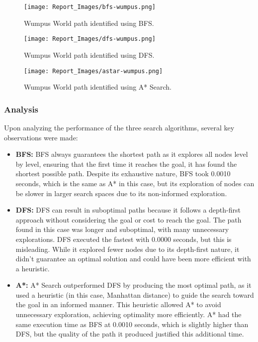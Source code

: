 \documentclass[12pt]{article}
\begin{document}
\begin{figure}[h!]
\centering
\texttt{[image: Report\_Images/bfs-wumpus.png]}
\caption{Wumpus World path identified using BFS.}
\label{fig:BFS_wumpus}
\end{figure}

\begin{figure}[h!]
\centering
\texttt{[image: Report\_Images/dfs-wumpus.png]}
\caption{Wumpus World path identified using DFS.}
\label{fig:DFS_wumpus}
\end{figure}

\begin{figure}[h!]
\centering
\texttt{[image: Report\_Images/astar-wumpus.png]}
\caption{Wumpus World path identified using A* Search.}
\label{fig:Astar_wumpus}
\end{figure}

\subsubsection{Analysis}

Upon analyzing the performance of the three search algorithms, several key observations were made:

\begin{itemize}
    \item \textbf{BFS:} BFS always guarantees the shortest path as it explores all nodes level by level, ensuring that the first time it reaches the goal, it has found the shortest possible path. Despite its exhaustive nature, BFS took 0.0010 seconds, which is the same as A* in this case, but its exploration of nodes can be slower in larger search spaces due to its non-informed exploration.
    \item \textbf{DFS:} DFS can result in suboptimal paths because it follows a depth-first approach without considering the goal or cost to reach the goal. The path found in this case was longer and suboptimal, with many unnecessary explorations. DFS executed the fastest with 0.0000 seconds, but this is misleading. While it explored fewer nodes due to its depth-first nature, it didn't guarantee an optimal solution and could have been more efficient with a heuristic.
    \item \textbf{A*:} A* Search outperformed DFS by producing the most optimal path, as it used a heuristic (in this case, Manhattan distance) to guide the search toward the goal in an informed manner. This heuristic allowed A* to avoid unnecessary exploration, achieving optimality more efficiently. A* had the same execution time as BFS at 0.0010 seconds, which is slightly higher than DFS, but the quality of the path it produced justified this additional time.
\end{itemize}
\end{document}
